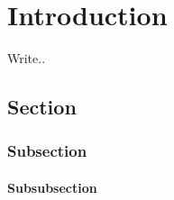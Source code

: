 
\chapter{Introduction}
\label{ch:introduction}

Write..
\section{Section}

\cite{ghc-pps}

\subsection{Subsection}

\subsubsection{Subsubsection}